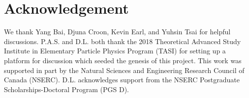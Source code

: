 \documentclass[nofootinbib,twocolumn,preprintnumbers]{revtex4-1}
\begin{document}
\section*{Acknowledgement}

We thank Yang Bai, Djuna Croon, Kevin Earl, and Yuhsin Tsai for helpful discussions. P.A.S. and D.L. both thank the 2018 Theoretical Advanced Study Institute in Elementary Particle Physics Program (TASI) for setting up a platform for discussion which seeded the genesis of this project. This work was supported in part by the Natural Sciences and Engineering Research Council of Canada (NSERC). D.L. acknowledges support from the NSERC Postgraduate Scholarships-Doctoral Program (PGS D).


\appendix


\end{document}
